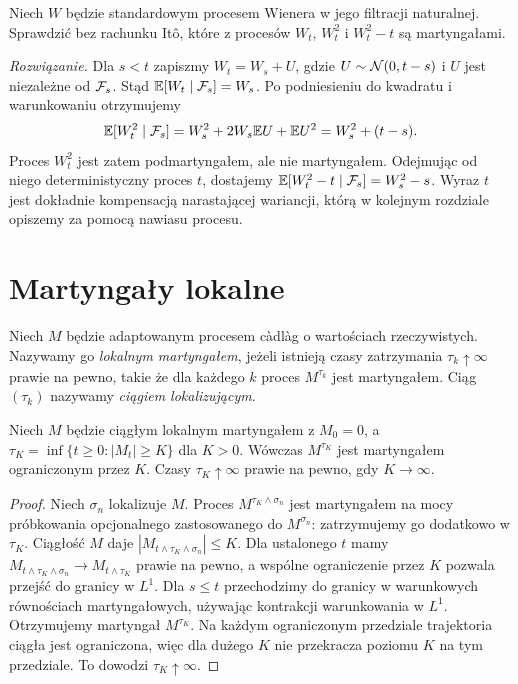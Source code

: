 \begin{zadanie}
Niech $W$ będzie standardowym procesem Wienera w jego
filtracji naturalnej. Sprawdzić bez rachunku It\^o, które
z procesów $W_t$, $W_t^2$ i $W_t^2-t$ są martyngałami.

\emph{Rozwiązanie.} Dla $s<t$ zapiszmy
$W_t=W_s+U$, gdzie $U\sim\mathcal{N}(0,t-s)$
i $U$ jest niezależne od $\mathcal{F}_s$.
Stąd $\mathbb{E}[W_t\mid\mathcal{F}_s]=W_s$.
Po podniesieniu do kwadratu i warunkowaniu otrzymujemy
\[
\mathbb{E}[W_t^2\mid\mathcal{F}_s]
=W_s^2+2W_s\mathbb{E} U+\mathbb{E} U^2=W_s^2+(t-s).
\]
Proces $W_t^2$ jest zatem podmartyngałem, ale nie
martyngałem. Odejmując od niego deterministyczny
proces $t$, dostajemy
$\mathbb{E}[W_t^2-t\mid\mathcal{F}_s]=W_s^2-s$.
Wyraz $t$ jest dokładnie kompensacją narastającej
wariancji, którą w kolejnym rozdziale opiszemy za
pomocą nawiasu procesu.
\end{zadanie}

\section{Martyngały lokalne}
\begin{definicja}
Niech $M$ będzie adaptowanym procesem c\`adl\`ag o
wartościach rzeczywistych. Nazywamy go \emph{lokalnym
martyngałem}, jeżeli istnieją czasy zatrzymania
$\tau_k\uparrow\infty$ prawie na pewno, takie że dla
każdego $k$ proces $M^{\tau_k}$ jest martyngałem.
Ciąg $(\tau_k)$ nazywamy \emph{ciągiem lokalizującym}.
\end{definicja}

\begin{twierdzenie}
Niech $M$ będzie ciągłym lokalnym martyngałem z $M_0=0$,
a $\tau_K=\inf\{t\ge0:|M_t|\ge K\}$ dla $K>0$.
Wówczas $M^{\tau_K}$ jest martyngałem ograniczonym
przez $K$. Czasy $\tau_K\uparrow\infty$ prawie na pewno,
gdy $K\to\infty$.
\end{twierdzenie}
\begin{proof}
Niech $\sigma_n$ lokalizuje $M$. Proces
$M^{\tau_K\wedge\sigma_n}$ jest martyngałem na mocy
próbkowania opcjonalnego zastosowanego do
$M^{\sigma_n}$: zatrzymujemy go dodatkowo w $\tau_K$.
Ciągłość $M$ daje $|M_{t\wedge\tau_K\wedge\sigma_n}|\le K$.
Dla ustalonego $t$ mamy
$M_{t\wedge\tau_K\wedge\sigma_n}\to M_{t\wedge\tau_K}$
prawie na pewno, a wspólne ograniczenie przez $K$
pozwala przejść do granicy w $L^1$.
Dla $s\le t$ przechodzimy do granicy w warunkowych
równościach martyngałowych, używając kontrakcji warunkowania
w $L^1$. Otrzymujemy martyngał $M^{\tau_K}$.
Na każdym ograniczonym przedziale trajektoria ciągła jest
ograniczona, więc dla dużego $K$ nie przekracza poziomu
$K$ na tym przedziale. To dowodzi $\tau_K\uparrow\infty$.
\end{proof}

